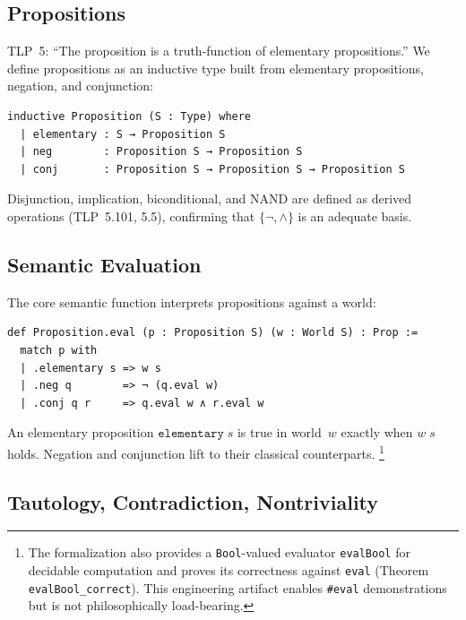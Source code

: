 \documentclass[10pt, letterpaper]{article}
\theoremstyle{definition}
\theoremstyle{remark}
\begin{document}
\subsection{Propositions}
\label{sec:propositions}

TLP~5: ``The proposition is a truth-function of elementary
propositions.''  We define propositions as an inductive type
built from elementary propositions, negation, and conjunction:

\begin{lstlisting}
inductive Proposition (S : Type) where
  | elementary : S → Proposition S
  | neg        : Proposition S → Proposition S
  | conj       : Proposition S → Proposition S → Proposition S
\end{lstlisting}

\noindent
Disjunction, implication, biconditional, and NAND are defined as
derived operations (TLP~5.101, 5.5), confirming that $\{\lnot, \land\}$
is an adequate basis.

\subsection{Semantic Evaluation}
\label{sec:eval}

The core semantic function interprets propositions against a
world:

\begin{lstlisting}
def Proposition.eval (p : Proposition S) (w : World S) : Prop :=
  match p with
  | .elementary s => w s
  | .neg q        => ¬ (q.eval w)
  | .conj q r     => q.eval w ∧ r.eval w
\end{lstlisting}

\noindent
An elementary proposition $\mathtt{elementary}\;s$ is true in
world~$w$ exactly when $w\;s$ holds.  Negation and conjunction
lift to their classical counterparts.%
\footnote{The formalization also provides a
\texttt{Bool}-valued evaluator \texttt{evalBool} for decidable
computation and proves its correctness against
\texttt{eval} (Theorem \texttt{evalBool\_correct}).
This engineering artifact enables \texttt{\#eval} demonstrations
but is not philosophically load-bearing.}

\subsection{Tautology, Contradiction, Nontriviality}
\label{sec:tautology}
\end{document}
